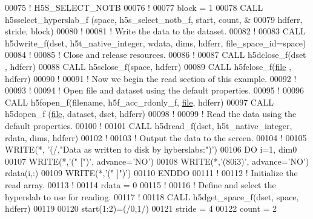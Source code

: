 \begin{DoxyCode}
00075   \textcolor{comment}{! H5S\_SELECT\_NOTB}
00076   \textcolor{comment}{!}
00077   block = 1
00078   \textcolor{keyword}{CALL }h5sselect\_hyperslab\_f (space, h5s\_select\_notb\_f, start, count, &
00079        hdferr, stride, block)
00080   \textcolor{comment}{!}
00081   \textcolor{comment}{! Write the data to the dataset.}
00082   \textcolor{comment}{!}
00083   \textcolor{keyword}{CALL }h5dwrite\_f(dset, h5t\_native\_integer, wdata, dims, hdferr, file\_space\_id=space)
00084   \textcolor{comment}{!}
00085   \textcolor{comment}{! Close and release resources.}
00086   \textcolor{comment}{!}
00087   \textcolor{keyword}{CALL }h5dclose\_f(dset , hdferr)
00088   \textcolor{keyword}{CALL }h5sclose\_f(space, hdferr)
00089   \textcolor{keyword}{CALL }h5fclose\_f(\hyperlink{structfile}{file} , hdferr)
00090   \textcolor{comment}{!}
00091   \textcolor{comment}{! Now we begin the read section of this example.}
00092   \textcolor{comment}{!}
00093   \textcolor{comment}{!}
00094   \textcolor{comment}{! Open file and dataset using the default properties.}
00095   \textcolor{comment}{!}
00096   \textcolor{keyword}{CALL }h5fopen\_f(filename, h5f\_acc\_rdonly\_f, \hyperlink{structfile}{file}, hdferr)
00097   \textcolor{keyword}{CALL }h5dopen\_f (\hyperlink{structfile}{file}, dataset, dset, hdferr)
00098   \textcolor{comment}{!}
00099   \textcolor{comment}{! Read the data using the default properties.}
00100   \textcolor{comment}{!}
00101   \textcolor{keyword}{CALL }h5dread\_f(dset, h5t\_native\_integer, rdata, dims, hdferr)
00102   \textcolor{comment}{!}
00103   \textcolor{comment}{! Output the data to the screen.}
00104   \textcolor{comment}{!}
00105   \textcolor{keyword}{WRITE}(*, \textcolor{stringliteral}{'(/,"Data as written to disk by hyberslabs:")'})
00106   \textcolor{keywordflow}{DO} i=1, dim0
00107      \textcolor{keyword}{WRITE}(*,\textcolor{stringliteral}{'(" [")'}, advance=\textcolor{stringliteral}{'NO'})
00108      \textcolor{keyword}{WRITE}(*,\textcolor{stringliteral}{'(80i3)'}, advance=\textcolor{stringliteral}{'NO'}) rdata(i,:)
00109      \textcolor{keyword}{WRITE}(*,\textcolor{stringliteral}{'(" ]")'})
00110 \textcolor{keywordflow}{  ENDDO}
00111   \textcolor{comment}{!}
00112   \textcolor{comment}{! Initialize the read array.}
00113   \textcolor{comment}{!}
00114   rdata = 0
00115   \textcolor{comment}{!}
00116   \textcolor{comment}{! Define and select the hyperslab to use for reading.}
00117   \textcolor{comment}{!}
00118   \textcolor{keyword}{CALL }h5dget\_space\_f(dset, space, hdferr)
00119 
00120   start(1:2)=(/0,1/)
00121   stride = 4
00122   count = 2

\end{DoxyCode}
